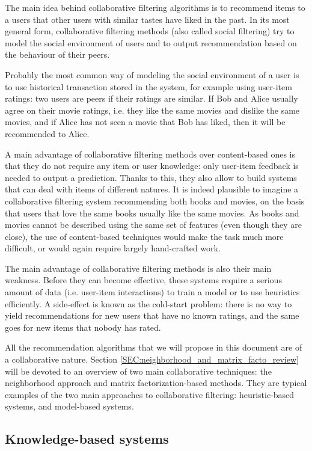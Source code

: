 The main idea behind collaborative filtering algorithms is to recommend items
to a users that other users with similar tastes have liked in the past. In its
most general form, collaborative filtering methods (also called social
filtering) try to model the social environment of users and to output
recommendation based on the behaviour of their peers.

Probably the most common way of modeling the social environment of a user is to
use historical transaction stored in the system, for example using user-item
ratings: two users are peers if their ratings are similar. If Bob and Alice
usually agree on their movie ratings, i.e. they like the same movies and
dislike the same movies, and if Alice has not seen a movie that Bob has liked,
then it will be recommended to Alice.

A main advantage of collaborative filtering methods over content-based ones is
that they do not require any item or user knowledge: only user-item feedback is
needed to output a prediction. Thanks to this, they also allow to build systems
that can deal with items of different natures. It is indeed plausible to
imagine a collaborative filtering system recommending both books and movies, on
the basis that users that love the same books usually like the same movies. As
books and movies cannot be described using the same set of features (even
though they are close), the use of content-based techniques would make the task
much more difficult, or would again require largely hand-crafted work.

The main advantage of collaborative filtering methods is also their main
weakness. Before they can become effective, these systems require a serious
amount of data (i.e. user-item interactions) to train a model or to use
heuristics efficiently. A side-effect is known as the cold-start problem: there
is no way to yield recommendations for new users that have no known ratings,
and the same goes for new items that nobody has rated.

All the recommendation algorithms that we will propose in this document are of
a collaborative nature. Section \ref{SEC:neighborhood_and_matrix_facto_review}
will be devoted to an overview of two main collaborative techniques: the
neighborhood approach and matrix factorization-based methods. They are
typical examples of the two main approaches to collaborative filtering:
heuristic-based systems, and model-based systems.

\subsection{Knowledge-based systems}

